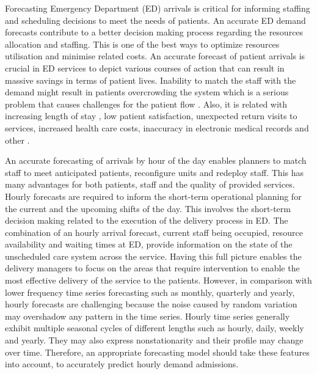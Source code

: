\documentclass[]{elsarticle} %
\begin{document}
Forecasting Emergency Department (ED) arrivals is critical for informing staffing and scheduling decisions to meet the needs of patients. An accurate ED demand forecasts contribute to a better decision making process regarding the resources allocation and staffing. This is one of the best ways to optimize resources utilisation and minimise related costs.
An accurate forecast of patient arrivals is crucial in ED services to depict various courses of action that can result in massive savings in terms of patient lives. Inability to match the staff with the demand might result in patients overcrowding the system which is a serious problem that causes challenges for the patient flow \citep{derlet2002overcrowding}. Also, it is related with increasing length of stay \citep{muhammet2015forecasting}, low patient satisfaction, unexpected return visits to services, increased health care costs, inaccuracy in electronic medical records and other \citep{rostami2020anticipating}.

An accurate forecasting of arrivals by hour of the day enables planners to match staff to meet anticipated patients, reconfigure units and redeploy staff. This has many advantages for both patients, staff and the quality of provided services. Hourly forecasts are required to inform the short-term operational planning for the current and the upcoming shifts of the day. This involves the short-term decision making related to the execution of the delivery process in ED.
The combination of an hourly arrival forecast, current staff being occupied, resource availability and waiting times at ED, provide information on the state of the unscheduled care system across the service. Having this full picture enables the delivery managers to focus on the areas that require intervention to enable the most effective delivery of the service to the patients. However, in comparison with lower frequency time series forecasting such as monthly, quarterly and yearly, hourly forecasts are challenging because the noise caused by random variation may overshadow any pattern in the time series. Hourly time series generally exhibit multiple seasonal cycles of different lengths such as hourly, daily, weekly and yearly. They may also express nonstationarity and their profile may change over time. Therefore, an appropriate forecasting model should take these features into account, to accurately predict hourly demand admissions.
\end{document}
